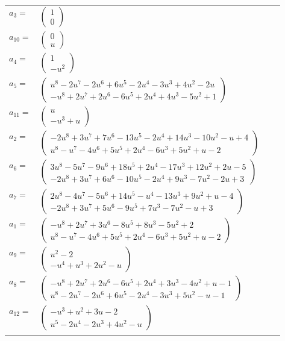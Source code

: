 \documentclass[1p]{elsarticle_modified}
\theoremstyle{definition}
\begin{document}
\begin{tabular}{m{7pt} m{180pt} m{7pt} m{180pt} }
\flushright $a_{3}=$&$\begin{pmatrix}1\\0\end{pmatrix}$ \\
\flushright $a_{10}=$&$\begin{pmatrix}0\\u\end{pmatrix}$ \\
\flushright $a_{4}=$&$\begin{pmatrix}1\\- u^2\end{pmatrix}$ \\
\flushright $a_{5}=$&$\begin{pmatrix}u^8-2 u^7-2 u^6+6 u^5-2 u^4-3 u^3+4 u^2-2 u\\- u^8+2 u^7+2 u^6-6 u^5+2 u^4+4 u^3-5 u^2+1\end{pmatrix}$ \\
\flushright $a_{11}=$&$\begin{pmatrix}u\\- u^3+u\end{pmatrix}$ \\
\flushright $a_{2}=$&$\begin{pmatrix}-2 u^8+3 u^7+7 u^6-13 u^5-2 u^4+14 u^3-10 u^2- u+4\\u^8- u^7-4 u^6+5 u^5+2 u^4-6 u^3+5 u^2+u-2\end{pmatrix}$ \\
\flushright $a_{6}=$&$\begin{pmatrix}3 u^8-5 u^7-9 u^6+18 u^5+2 u^4-17 u^3+12 u^2+2 u-5\\-2 u^8+3 u^7+6 u^6-10 u^5-2 u^4+9 u^3-7 u^2-2 u+3\end{pmatrix}$ \\
\flushright $a_{7}=$&$\begin{pmatrix}2 u^8-4 u^7-5 u^6+14 u^5- u^4-13 u^3+9 u^2+u-4\\-2 u^8+3 u^7+5 u^6-9 u^5+7 u^3-7 u^2- u+3\end{pmatrix}$ \\
\flushright $a_{1}=$&$\begin{pmatrix}- u^8+2 u^7+3 u^6-8 u^5+8 u^3-5 u^2+2\\u^8- u^7-4 u^6+5 u^5+2 u^4-6 u^3+5 u^2+u-2\end{pmatrix}$ \\
\flushright $a_{9}=$&$\begin{pmatrix}u^2-2\\- u^4+u^3+2 u^2- u\end{pmatrix}$ \\
\flushright $a_{8}=$&$\begin{pmatrix}- u^8+2 u^7+2 u^6-6 u^5+2 u^4+3 u^3-4 u^2+u-1\\u^8-2 u^7-2 u^6+6 u^5-2 u^4-3 u^3+5 u^2- u-1\end{pmatrix}$ \\
\flushright $a_{12}=$&$\begin{pmatrix}- u^3+u^2+3 u-2\\u^5-2 u^4-2 u^3+4 u^2- u\end{pmatrix}$\\&\end{tabular}
\end{document}
